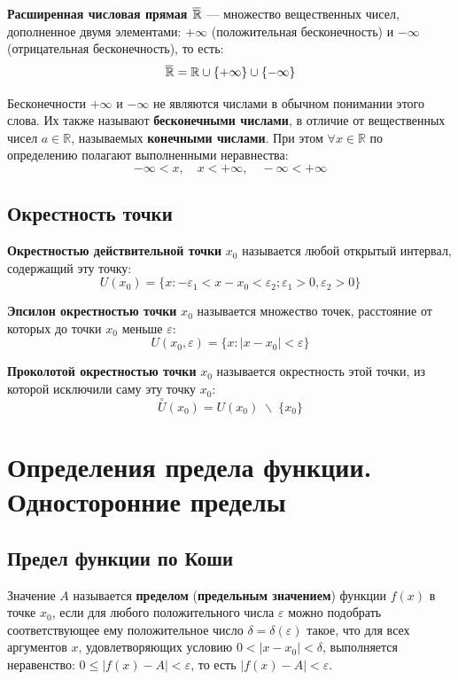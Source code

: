 \documentclass[a4paper,12pt,oneside]{extbook}
\theoremstyle{numbered}
\theoremstyle{unnumbered}
\theoremstyle{named}
\theoremstyle{unnumbered}
\theoremstyle{named}
\theoremstyle{named}
\theoremstyle{named}
\newcommand{\overbar}[1]{\mkern 1.5mu\overline{\mkern0mu#1\mkern-1.5mu}\mkern 1.5mu}
\begin{document}
\begin{siderules}
    \textbf{Расширенная числовая прямая} \(\overbar{\mathbb{R}}\) — множество вещественных чисел, дополненное двумя элементами: \(+\infty\) (положительная бесконечность) и \(-\infty\) (отрицательная бесконечность), то есть:
    \[
        \overbar{\mathbb{R}} = \mathbb{R} \cup \{+\infty\} \cup \{-\infty\}
    \]
\end{siderules}

Бесконечности \(+\infty\) и \(-\infty\) не являются числами в обычном понимании этого слова. Их также называют \textbf{бесконечными числами}, в отличие от вещественных чисел \(a \in \mathbb{R}\), называемых \textbf{конечными числами}. При этом \(\forall x \in \mathbb{R}\) по определению полагают выполненными неравнества:
\[
    -\infty < x, \quad x < +\infty, \quad -\infty < +\infty
\]

\subsection{Окрестность точки}%
\label{sub:Окрестность точки}

\textbf{Окрестностью действительной точки} \(x_0\) называется любой открытый интервал, содержащий эту точку:
\[
    U(x_0) = \{x: -\varepsilon_1 < x - x_0 < \varepsilon_2; \varepsilon_1 > 0, \varepsilon_2 > 0\}
\]

\textbf{Эпсилон окрестностью точки} \(x_0\) называется множество точек, расстояние от которых до точки \(x_0\) меньше \(\varepsilon\):
\[
    U(x_0, \varepsilon) = \{x: |x - x_0| < \varepsilon\}
\]

\textbf{Проколотой окрестностью точки} \(x_0\) называется окрестность этой точки, из которой исключили саму эту точку \(x_0\):
\[
    \overset{\circ}{U}(x_0) = U(x_0) \; \backslash \; \{x_0\}
\]


\section{Определения предела функции. Односторонние пределы}%
\label{sec:Определения предела функции. Односторонние пределы}

\subsection{Предел функции по Коши}%
\label{sub:Предел функции по Коши}

Значение \(A\) называется \textbf{пределом} (\textbf{предельным значением}) функции \(f(x)\) в точке \(x_0\), если для любого положительного числа \(\varepsilon\) можно подобрать соответствующее ему положительное число \(\delta = \delta (\varepsilon)\) такое, что для всех аргументов \(x\), удовлетворяющих условию \(0 < |x - x_0| < \delta\), выполняется неравенство: \(0 \leq |f(x) - A| < \varepsilon\), то есть \(|f(x) -A| < \varepsilon\).
\end{document}
